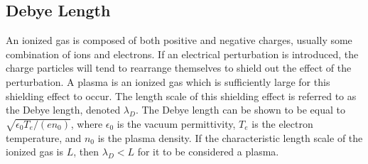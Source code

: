 \subsection{Debye Length}
An ionized gas is composed of both positive and negative charges, usually some
combination of ions and electrons. If an electrical perturbation is introduced,
the charge particles will tend to rearrange themselves to shield out the effect
of the perturbation. A plasma is an ionized gas which is sufficiently large for
this shielding effect to occur. The length scale of this shielding effect is
referred to as the Debye length, denoted $\lambda_D$. The Debye length can be
shown to be equal to $\sqrt{\epsilon_0T_e/(en_0)}$, where $\epsilon_0$ is the
vacuum permittivity, $T_e$ is the electron temperature, and $n_0$ is the plasma
density. If the characteristic length scale of the ionized gas is $L$, then
$\lambda_D < L$ for it to be considered a plasma.

